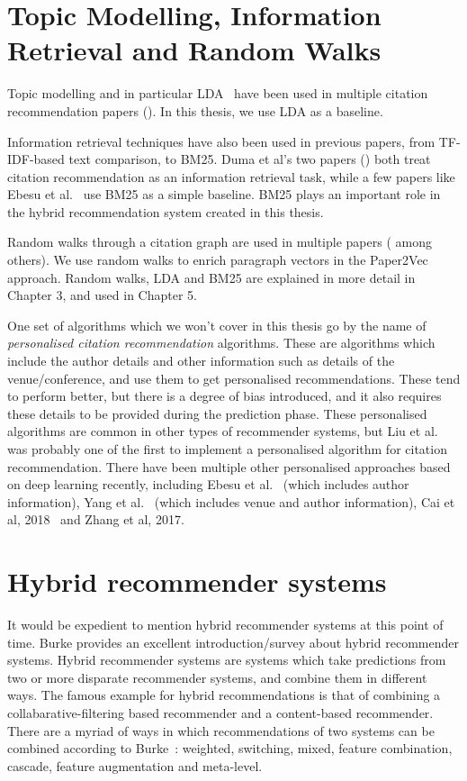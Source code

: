 \section{Topic Modelling, Information Retrieval and Random Walks}
Topic modelling and in particular LDA~\cite{BleiNJ03} have been used in multiple citation recommendation papers (\cite{KatariaMB10, DBLP:Jiang13, NallapatiAXC08, LiuYGSG14}). In this thesis, we use LDA as a baseline.

Information retrieval techniques have also been used in previous papers, from TF-IDF-based text comparison, to BM25. Duma et al's two papers (\cite{DumaKLRC16, DumaLCRK16}) both treat citation recommendation as an information retrieval task, while a few papers like Ebesu et al.~\cite{Ebesu2017} use BM25 as a simple baseline. BM25 plays an important role in the hybrid recommendation system created in this thesis. 

Random walks through a citation graph are used in multiple papers (\cite{JiangLL18, JiangYGLL18, CaiHY18, ChakrabortyMNN15} among others). We use random walks to enrich paragraph vectors in the Paper2Vec approach.
Random walks, LDA and BM25 are explained in more detail in Chapter 3, and used in Chapter 5.

One set of algorithms which we won't cover in this thesis go by the name of \textit{personalised citation recommendation} algorithms. These are algorithms which include the author details and other information such as details of the venue/conference, and use them to get personalised recommendations. These tend to perform better, but there is a degree of bias introduced, and it also requires these details to be provided during the prediction phase. 
These personalised algorithms are common in other types of recommender systems, but Liu et al.~\cite{LiuYY13} was probably one of the first to implement a personalised algorithm for citation recommendation. There have been multiple other personalised approaches based on deep learning recently, including Ebesu et al.~\cite{Ebesu2017} (which includes author information), Yang et al.~\cite{YangZCDMGD18} (which includes venue and author information), Cai et al, 2018~\cite{CaiHY18} and Zhang et al, 2017.~\cite{Zhang2017}
\section{Hybrid recommender systems}
It would be expedient to mention hybrid recommender systems at this point of time. Burke \cite{Burke2002, Burke2007} provides an excellent introduction/survey about hybrid recommender systems. Hybrid recommender systems are systems which take predictions from two or more disparate recommender systems, and combine them in different ways. The famous example for hybrid recommendations is that of combining a collabarative-filtering based recommender and a content-based recommender. 
There are a myriad of ways in which recommendations of two systems can be combined according to Burke~\cite{Burke2002}: weighted, switching, mixed, feature combination, cascade, feature augmentation and meta-level. 

